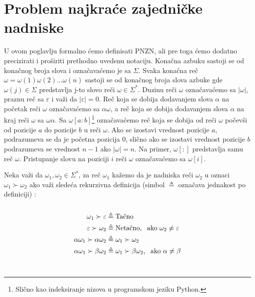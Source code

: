 \documentclass[12pt,oneside]{memoir}
\begin{document}
\section{Problem najkraće zajedničke nadniske}
U ovom poglavlju formalno ćemo definisati PNZN, ali pre toga ćemo dodatno precizirati i proširiti prethodno uvedenu notaciju. Konačna azbuku sastoji se od konačnog broja slova i označavaćemo je sa $\Sigma$. Svaka konačna reč
$\omega=\omega(1)\omega(2)...\omega(n)$ sastoji se od konačnog broja slova azbuke gde $\omega(j)\in\Sigma$ predstavlja j-to slovo reči $\omega\in\Sigma^*$.
Duzinu reči $\omega$ označavaćemo sa $|\omega|$, praznu reč sa $\varepsilon$ i važi da $|\varepsilon|=0$. 
Reč koja se dobija dodavanjem
slova $\alpha$ na početak reči $\omega$ označavaćemo sa $\alpha\omega$,
a reč koja se dobija dodavanjem slova $\alpha$ na kraj reči $\omega$ sa $\omega\alpha$.
Sa $\omega[a:b]$\footnote{Slično kao indeksiranje nizova u programskom jeziku Python.} označavaćemo reč koja se dobija od
reči $\omega$ počevši od pozicije $a$ do pozicije $b$ u reči $\omega$. Ako se izostavi vrednost pozicije $a$, podrazumeva se
da je početna pozicija 0, slično ako se izostavi vrednost pozicije $b$ podrazumeva se vrednost $n-1$ ako $|\omega|=n$.
Na primer, $\omega[:]$ predstavlja samu reč $\omega$. Pristupanje slovu na poziciji $i$ reči $\omega$ 
označavaćemo sa $\omega[i]$.

Neka važi da $\omega_{1},\omega_{2}\in\Sigma^*$, za reč $\omega_{1}$ kažemo da je
nadniska reči $\omega_{2}$ u oznaci $\omega_{1}\succ\omega_{2}$ ako važi sledeća
rekurzivna definicija (simbol $\triangleq$ označava jednakost po definiciji) \cite{ProbabilisticBS}:
\\
\\
\begin{equation}
\begin{aligned}
\omega_{1}\succ\varepsilon &\triangleq \textrm{Tačno}\\
\varepsilon\succ\omega_{2} &\triangleq \textrm{Netačno, \:\:ako } \omega_{2}\neq\varepsilon\\
\alpha\omega_{1}\succ\alpha\omega_{2} &\triangleq \omega_{1}\succ\omega_{2}\\
\alpha\omega_{1}\succ\beta\omega_{2} &\triangleq \omega_{1}\succ\beta\omega_{2} \textrm{, \:\:ako } \alpha\neq\beta
\end{aligned}
\end{equation}
\\
\end{document}
